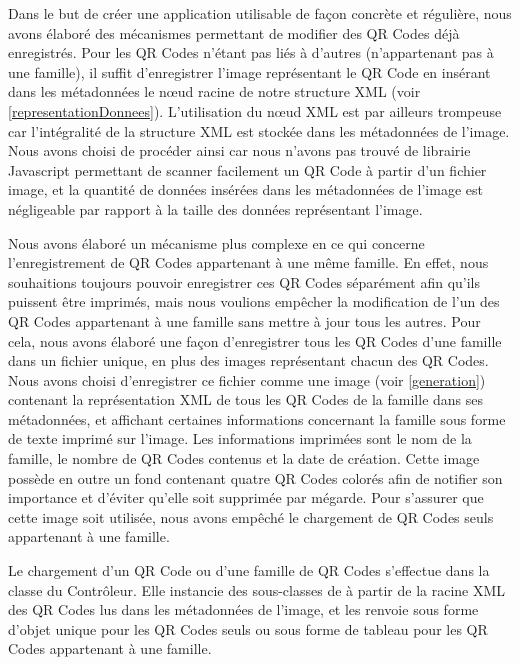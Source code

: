 \par
Dans le but de créer une application utilisable de façon concrète et régulière, nous avons élaboré des mécanismes permettant de modifier des QR Codes déjà enregistrés. Pour les QR Codes n'étant pas liés à d'autres (n'appartenant pas à une famille), il suffit d'enregistrer l'image représentant le QR Code en insérant dans les métadonnées le nœud racine de notre structure XML (voir \ref{representationDonnees}). L'utilisation du nœud XML  est par ailleurs trompeuse car l'intégralité de la structure XML est stockée dans les métadonnées de l'image. Nous avons choisi de procéder ainsi car nous n'avons pas trouvé de librairie Javascript permettant de scanner facilement un QR Code à partir d'un fichier image, et la quantité de données insérées dans les métadonnées de l'image est négligeable par rapport à la taille des données représentant l'image.\\
\par
Nous avons élaboré un mécanisme plus complexe en ce qui concerne l'enregistrement de QR Codes appartenant à une même famille. En effet, nous souhaitions toujours pouvoir enregistrer ces QR Codes séparément afin qu'ils puissent être imprimés, mais nous voulions empêcher la modification de l'un des QR Codes appartenant à une famille sans mettre à jour tous les autres. Pour cela, nous avons élaboré une façon d'enregistrer tous les QR Codes d'une famille dans un fichier unique, en plus des images représentant chacun des QR Codes. Nous avons choisi d'enregistrer ce fichier comme une image (voir \ref{generation}) contenant la représentation XML de tous les QR Codes de la famille dans ses métadonnées, et affichant certaines informations concernant la famille sous forme de texte imprimé sur l'image. Les informations imprimées sont le nom de la famille, le nombre de QR Codes contenus et la date de création. Cette image possède en outre un fond contenant quatre QR Codes colorés afin de notifier son importance et d'éviter qu'elle soit supprimée par mégarde. Pour s'assurer que cette image soit utilisée, nous avons empêché le chargement de QR Codes seuls appartenant à une famille.\\
\par
Le chargement d'un QR Code ou d'une famille de QR Codes s'effectue dans la classe  du Contrôleur. Elle instancie des sous-classes de  à partir de la racine XML des QR Codes lus dans les métadonnées de l'image, et les renvoie sous forme d'objet unique pour les QR Codes seuls ou sous forme de tableau pour les QR Codes appartenant à une famille.